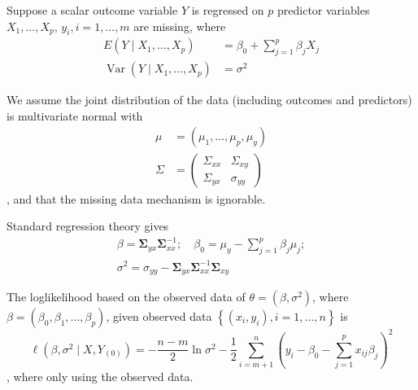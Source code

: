\begin{example}
    Suppose a scalar outcome variable $Y$ is regressed on $p$ predictor variables $X_{1},\ldots,X_{p}$, $y_{i},i=1,\ldots,m$ are missing, where
    \begin{equation}
        \begin{aligned}
            E\left(Y \mid X_{1}, \ldots, X_{p}\right)                  & =\beta_{0}+\sum_{j=1}^{p} \beta_{j} X_{j} \\
            \operatorname{Var}\left(Y \mid X_{1}, \ldots, X_{p}\right) & =\sigma^{2}
        \end{aligned}
    \end{equation}

    We assume the joint distribution of the data (including outcomes and predictors) is multivariate normal with
    \begin{equation}
        \begin{aligned}
            \mu    & =\left(\mu_{1}, \ldots, \mu_{p}, \mu_{y}\right) \\
            \Sigma & =\left(\begin{array}{ll}
                                    \Sigma_{x x} & \Sigma_{x y} \\
                                    \Sigma_{y x} & \sigma_{y y}
                                \end{array}\right)
        \end{aligned}
    \end{equation}
    , and that the missing data mechanism is ignorable.

    Standard regression theory gives
    \begin{equation}
        \begin{array}{c}
            \beta=\boldsymbol{\Sigma}_{y x} \boldsymbol{\Sigma}_{x x}^{-1} ; \quad \beta_{0}=\mu_{y}-\sum_{j=1}^{p} \beta_{j} \mu_{j} ; \\
            \sigma^{2}=\sigma_{y y}-\boldsymbol{\Sigma}_{y x} \boldsymbol{\Sigma}_{x x}^{-1} \boldsymbol{\Sigma}_{x y}
        \end{array}
    \end{equation}

    The loglikelihood based on the observed data of $\theta=\left(\beta,\sigma^{2}\right)$, where $\beta=\left(\beta_{0},\beta_{1},\ldots,\beta_{p}\right)$, given observed data $\left\{\left(x_{i},y_{i}\right),i=1,\ldots,n\right\}$ is
    \begin{equation}
        \ell(\beta, \sigma^{2} \mid X, Y_{(0)})=-\frac{n-m}{2}\ln\sigma^2-\frac{1}{2}\sum_{i=m+1}^{n}\left(y_{i}-\beta_{0}-\sum_{j=1}^{p}x_{ij}\beta_{j}\right)^2
    \end{equation}
    , where only using the observed data.


\end{example}
